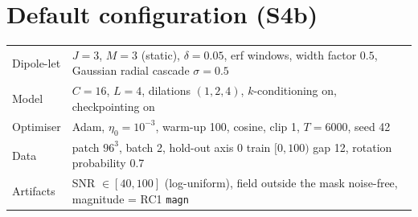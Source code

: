 \documentclass[11pt]{article}
\newcommand{\code}[1]{\texttt{#1}}
\theoremstyle{remark}
\begin{document}
\section{Default configuration (S4b)}
\begin{table}[h]
\centering\small
\begin{tabular}{@{}lp{12.4cm}@{}}
\toprule
Dipole-let & $J=3$, $M=3$ (static), $\delta=0.05$, erf windows, width factor $0.5$, Gaussian radial cascade $\sigma=0.5$ \\
Model & $C=16$, $L=4$, dilations $(1,2,4)$, $k$-conditioning on, checkpointing on \\
Optimiser & Adam, $\eta_0=10^{-3}$, warm-up 100, cosine, clip 1, $T=6000$, seed 42 \\
Data & patch $96^3$, batch 2, hold-out axis 0 train $[0,100)$ gap 12, rotation probability 0.7 \\
Artifacts & SNR $\in[40,100]$ (log-uniform), field outside the mask noise-free, magnitude = RC1 \code{magn} \\
\bottomrule
\end{tabular}
\end{table}
\end{document}

